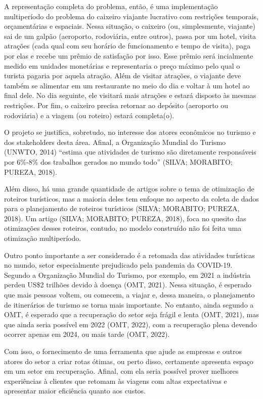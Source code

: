A representação completa do problema, então, é uma implementação multiperíodo do problema do caixeiro viajante lucrativo com restrições temporais, orçamentárias e espaciais. Nessa situação, o caixeiro (ou, simplesmente, viajante) sai de um galpão (aeroporto, rodoviária, entre outros), passa por um hotel, visita atrações (cada qual com seu horário de funcionamento e tempo de visita), paga por elas e recebe um prêmio de satisfação por isso. Esse prêmio será incialmente medido em unidades monetárias e representaria o preço máximo pelo qual o turista pagaria por aquela atração. Além de visitar atrações, o viajante deve também se alimentar em um restaurante no meio do dia e voltar à um hotel ao final dele. No dia seguinte, ele visitará mais atrações e estará disposto às mesmas restrições. Por fim, o caixeiro precisa retornar ao depósito (aeroporto ou rodoviária) e a viagem (ou roteiro) estará completa(o).

O projeto se justifica, sobretudo, no interesse dos atores econômicos no turismo e dos stakeholders desta área. Afinal, a Organização Mundial do Turismo (UNWTO, 2014) “estima que atividades de turismo são diretamente responsáveis por 6\%-8\% dos trabalhos gerados no mundo todo” (SILVA; MORABITO; PUREZA, 2018). 

Além disso, há uma grande quantidade de artigos sobre o tema de otimização de roteiros turísticos, mas a maioria deles tem enfoque no aspecto da coleta de dados para o planejamento de roteiros turísticos (SILVA; MORABITO; PUREZA, 2018). Um artigo (SILVA; MORABITO; PUREZA, 2018), foca no quesito das otimizações desses roteiros, contudo, no modelo construído não foi feita uma otimização multiperíodo.

Outro ponto importante a ser considerado é a retomada das atividades turísticas no mundo, setor especialmente prejudicado pela pandemia da COVID-19. Segundo a Organização Mundial do Turismo, por exemplo, em 2021 a indústria perdeu US\$2 trilhões devido à doença (OMT, 2021). Nessa situação, é esperado que mais pessoas voltem, ou comecem, a viajar e, dessa maneira, o planejamento de itinerários de turismo se torna mais importante. No entanto, ainda segundo a OMT, é esperado que a recuperação do setor seja frágil e lenta (OMT, 2021), mas que ainda seria possível em 2022 (OMT, 2022), com a recuperação plena devendo ocorrer apenas em 2024, ou mais tarde (OMT, 2022).

Com isso, o fornecimento de uma ferramenta que ajude as empresas e outros atores do setor a criar rotas ótimas, ou perto disso, certamente apresenta espaço em um setor em recuperação. Afinal, com ela seria possível prover melhores experiências à clientes que retomam às viagens com altas expectativas e apresentar maior eficiência quanto aos custos. 

